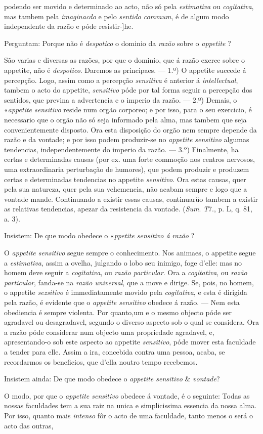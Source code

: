 podendo ser movido e determinado ao acto, não só pela \emph{estimativa} ou \emph{cogitativa}, mas tambem pela \emph{imaginacdo} e pelo \emph{sentido commum}, é de algum modo independente da razão e póde resistir-]he.\par Perguntam: Porque não é \emph{despotico} o dominio da \emph{razão} sobre o \emph{appetite} ?\par São varias e diversas as razões, por que o dominio, que á razão exerce sobre o appetite, não é \emph{despotico}. Daremos as principaes. --- 1.º) O appetite succede á percepção. Logo, assim como a percepção \emph{sensitiva} é anterior á \emph{intellectual}, tambem o acto do appetite, \emph{sensitivo} póde por tal forma seguir a percepção dos sentidos, que previna a advertencia e o imperio da razão. --- 2.º) Demais, o «\emph{appetite sensitivo} reside num orgão corporeo; e por isso, para o seu exercicio, é necessario que o orgão não só seja informado pela alma, mas tambem que seja convenientemente disposto. Ora esta disposição do orgão nem sempre depende da razão e da vontade; e por isso podem produzir-se no \emph{appetite sensitivo} algumas tendencias, independentemente do imperio da razão. --- 3.º) Finalmente, ha certas e determinadas causas (por ex. uma forte commoção nos centros nervosos, uma extraordinaria perturbação de humores), que podem produzir e produzem certas e determinadas tendencias no appetite \emph{sensitivo}. Ora estas causas, quer pela sua natureza, quer pela sua vehemencia, não acabam sempre e logo que a vontade mande. Continuando a existir essas causas, continuarüo tambem a existir as relativas tendencias, apezar da resistencia da vontade. (\emph{Sum}. \emph{T}7., p. L, q. 81, a. 3).\par Insistem: De que modo obedece o «\emph{ppetite sensitivo á razão} ?\par O \emph{appetite sensitivo} segue sempre o conhecimento. Nos animaes, o appetite segue a \emph{estimativa}, assim a ovelha, julgando o lobo seu inimigo, foge d'elle: mas no homem deve seguir a \emph{cogitativa}, ou \emph{razão particular}. Ora a \emph{cogitativa}, ou \emph{razão particular}, fanda-se na \emph{razão universal}, que a move e dirige. Se, pois, no homem, o appetite \emph{sezsitivo} é immediatamente movido pela \emph{cogitativa}, e esta é dirigida pela razão, é evidente que o \emph{appetite sensitivo} obedece á razão. --- Nem esta obediencia é sempre violenta. Por quanto,um e o mesmo objecto póde ser agradavel ou desagradavel, segundo o diverso aspecto sob o qual se considera. Ora a razão póde considerar num objecto uma propriedade agradavel, e, apresentando-o sob este aspecto ao appetite \emph{sensitivo}, póde mover esta faculdade a tender para elle. Assim a ira, concebida contra uma pessoa, acaba, se recordarmos os beneficios, que d'ella noutro tempo recebemos.\par Insistem ainda: De que modo obedece o \emph{appetite sensitivo} \& \emph{vontade}?\par O modo, por que o \emph{appetite sensitivo} obedece á vontade, é o seguinte: Todas as nossas faculdades tem a sua raiz na unica e simplicissima essencia da nossa alma. Por isso, quanto mais \emph{intenso} fôr o acto de uma faculdade, tanto menos o será o acto das outras, 